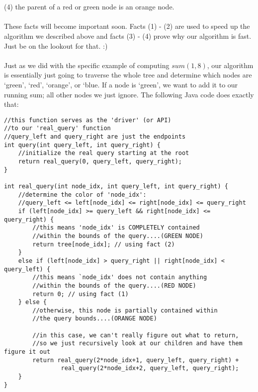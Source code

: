 \documentclass[11pt]{article}
\theoremstyle{plain}
\theoremstyle{definition}
\begin{document}
\\\\
(4) the parent of a red or green node is an orange node.
\\\\
These facts will become important soon. Facts (1) - (2) are used to speed up the algorithm we described above and facts (3) - (4) prove why our algorithm is fast. Just be on the lookout for that. :)
\\\\
Just as we did with the specific example of computing $sum(1, 8)$, our algorithm is essentially just going to traverse the whole tree and determine which nodes are `green', `red', `orange', or `blue. If a node is `green', we want to add it to our running sum; all other nodes we just ignore. The following Java code does exactly that:
\begin{lstlisting}
//this function serves as the 'driver' (or API)
//to our 'real_query' function
//query_left and query_right are just the endpoints
int query(int query_left, int query_right) {
	//initialize the real query starting at the root
	return real_query(0, query_left, query_right);
}

int real_query(int node_idx, int query_left, int query_right) {
	//determine the color of 'node_idx':
	//query_left <= left[node_idx] <= right[node_idx] <= query_right
	if (left[node_idx] >= query_left && right[node_idx] <= query_right) {
		//this means 'node_idx' is COMPLETELY contained
		//within the bounds of the query....(GREEN NODE)
		return tree[node_idx]; // using fact (2)
	}
	else if (left[node_idx] > query_right || right[node_idx] < query_left) {
		//this means `node_idx' does not contain anything
		//within the bounds of the query....(RED NODE)
		return 0; // using fact (1)
	} else {
		//otherwise, this node is partially contained within
		//the query bounds....(ORANGE NODE)

		//in this case, we can't really figure out what to return,
		//so we just recursively look at our children and have them figure it out
		return real_query(2*node_idx+1, query_left, query_right) +
				real_query(2*node_idx+2, query_left, query_right);
	}
}
\end{lstlisting}
\end{document}

